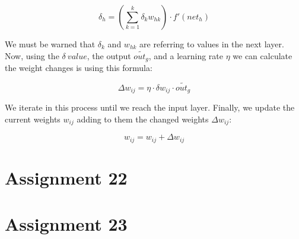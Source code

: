 \documentclass[12pt]{article}
\begin{document}
$$ \delta_{h} = (\sum_{k=1}^{k} \delta_{k} w_{hk}) \cdot f'(net_{h}) $$

We must be warned that $\delta_{k}$ and $w_{hk}$ are referring to values in the
next layer. Now, using the $\delta\: value$, the output $\widetilde{out_{g}}$,
and a learning rate $\eta$ we can calculate the weight changes is using
this formula:

$$ \Delta w_{ij} = \eta \cdot \delta w_{ij} \cdot \widetilde{out_{g}} $$

We iterate in this process until we reach the input layer. Finally, we update
the current weights $w_{ij}$ adding to them the changed weights $\Delta w_{ij} $:

$$ w_{ij} = w_{ij} + \Delta w_{ij} $$

\section{Assignment 22}

\section{Assignment 23}

 
\end{document}
